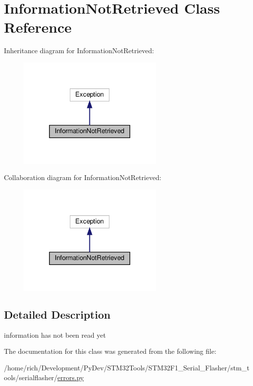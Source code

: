 \hypertarget{classstm__tools_1_1serialflasher_1_1errors_1_1InformationNotRetrieved}{}\section{Information\+Not\+Retrieved Class Reference}
\label{classstm__tools_1_1serialflasher_1_1errors_1_1InformationNotRetrieved}


Inheritance diagram for Information\+Not\+Retrieved\+:
\nopagebreak
\begin{figure}[H]
\begin{center}
\leavevmode
\includegraphics[width=203pt]{classstm__tools_1_1serialflasher_1_1errors_1_1InformationNotRetrieved__inherit__graph}
\end{center}
\end{figure}


Collaboration diagram for Information\+Not\+Retrieved\+:
\nopagebreak
\begin{figure}[H]
\begin{center}
\leavevmode
\includegraphics[width=203pt]{classstm__tools_1_1serialflasher_1_1errors_1_1InformationNotRetrieved__coll__graph}
\end{center}
\end{figure}


\subsection{Detailed Description}
\begin{DoxyVerb}information has not been read yet\end{DoxyVerb}
 

The documentation for this class was generated from the following file\+:\begin{DoxyCompactItemize}
\item 
/home/rich/\+Development/\+Py\+Dev/\+S\+T\+M32\+Tools/\+S\+T\+M32\+F1\+\_\+\+Serial\+\_\+\+Flasher/stm\+\_\+tools/serialflasher/\hyperlink{errors_8py}{errors.\+py}\end{DoxyCompactItemize}
